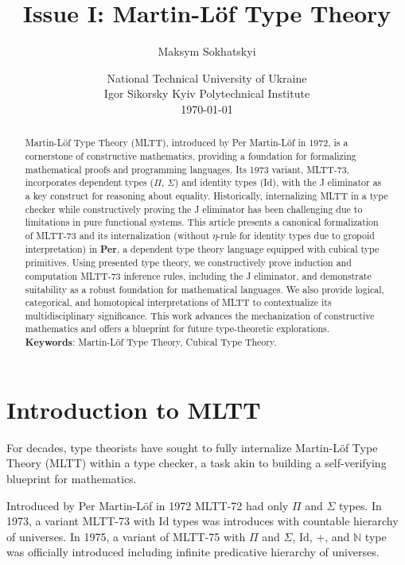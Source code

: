 \documentclass{article}
\begin{document}
\title  { Issue I: Martin-Löf Type Theory }
\author { Maksym Sokhatskyi }
\date   { National Technical University of Ukraine   \\ \small
          Igor Sikorsky Kyiv Polytechnical Institute \\ \today }

\maketitle

\begin{abstract}
Martin-Löf Type Theory (MLTT), introduced by Per Martin-Löf in 1972,
is a cornerstone of constructive mathematics, providing a foundation
for formalizing mathematical proofs and programming languages.
Its 1973 variant, MLTT-73, incorporates dependent types ($\Pi$, $\Sigma$)
and identity types (Id), with the J eliminator as a key construct for reasoning about equality.
Historically, internalizing MLTT in a type checker while constructively
proving the J eliminator has been challenging due to limitations in pure
functional systems. This article presents a canonical formalization of
MLTT-73 and its internalization (without $\eta$-rule for identity types due to gropoid interpretation)
in \textbf{Per}, a dependent type theory language equipped with cubical type primitives.
Using presented type theory, we constructively prove induction and computation MLTT-73 inference rules,
including the J eliminator, and demonstrate suitability as a robust foundation for mathematical languages.
We also provide logical, categorical, and homotopical interpretations of MLTT
to contextualize its multidisciplinary significance.
This work advances the mechanization of constructive mathematics and offers
a blueprint for future type-theoretic explorations. \\
\indent \textbf{Keywords}: Martin-Löf Type Theory, Cubical Type Theory.
\end{abstract}

\ifincludeTOC
  \tableofcontents
\fi

\newpage
\section*{Introduction to MLTT}

For decades, type theorists have sought to fully internalize
Martin-Löf Type Theory (MLTT) within a type checker, a task
akin to building a self-verifying blueprint for mathematics.

Introduced by Per Martin-Löf in 1972 \cite{Lof72} MLTT-72 had only $\Pi$ and $\Sigma$ types.
In 1973, a variant MLTT-73 with $\mathrm{Id}$ types was introduces with countable hierarchy of universes.
In 1975, a variant of MLTT-75 with $\Pi$ and $\Sigma$, $\mathrm{Id}$, $+$, and $\mathbb{N}$ type
was officially introduced \cite{Lof75} including infinite predicative hierarchy of universes.
\end{document}
